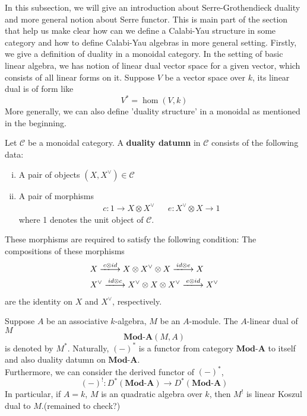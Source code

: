 In this subsection, we will give an introduction about Serre-Grothendieck duality and more general notion about Serre functor. This is main part of the section that help us make clear how can we define a Calabi-Yau structure in some category and how to define Calabi-Yau algebras in more general setting.
Firstly, we give a definition of duality in a monoidal category. In the setting of basic linear algebra, we has notion of linear dual vector space for a given vector, which consists of all linear forms on it. Suppose $V$ be a vector space over $k$, its linear dual is of form like
\[
V^* = \hom(V,k)
\]
More generally, we can also define 'duality structure' in a monoidal as mentioned in the beginning.
\begin{mydefn}
Let $\mathcal{C}$ be a monoidal category. A \textbf{duality datumn} in $\mathcal{C}$ consists of the following data:
\begin{enumerate}[(i)]
	\item A pair of objects $(X, X^{\vee}) \in \mathcal{C}$
	\item A pair of morphisms
	\begin{align*}
	c: 1 \rightarrow X \otimes X^{\vee}& & e: X^{\vee} \otimes X \rightarrow 1
	\end{align*}
	where 1 denotes the unit object of $\mathcal{C}$.
\end{enumerate}
These morphisms are required to satisfy the following condition:
The compositions of these morphisms
\begin{align*}
&X \xlongrightarrow{c \otimes id} X \otimes X^{\vee} \otimes X \xlongrightarrow{id \otimes e} X\\
&X^{\vee} \xlongrightarrow{id \otimes c} X^{\vee} \otimes X \otimes X^{\vee} \xlongrightarrow{e \otimes id} X^{\vee}
\end{align*}
are the identity on $X$ and $X^{\vee}$, respectively.
\end{mydefn}

Suppose $A$ be an associative $k$-algebra, $M$ be an $A$-module. The $A$-linear dual of $M$
\[
\textbf{Mod-A}(M,A)
\]
is denoted by $M^*$. Naturally, $(-)^*$ is a functor from category $\textbf{Mod-A}$ to itself and also duality datumn on $\textbf{Mod-A}$. \\
Furthermore, we can consider the derived functor of $(-)^*$,
\[(-)^! : D^{*}(\textbf{Mod-A}) \rightarrow D^{*}(\textbf{Mod-A})
\]
In particular, if $A=k$, $M$ is an quadratic algebra over $k$, then $M^!$ is linear Koszul dual to $M$.(remained to check?)